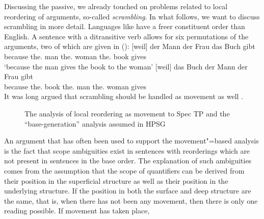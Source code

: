 \documentclass[output=paper
	        ,collection
	        ,collectionchapter
 	        ,biblatex
                ,babelshorthands
                ,newtxmath
                ,draftmode
                ,colorlinks, citecolor=brown
]{langscibook}
\begin{document}
Discussing the passive, we already touched on problems related to local reordering of arguments,
so-called \emph{scrambling}. In what follows, we want
to discuss scrambling in more detail. Languages like  have a freer constituent
order than English. A sentence with a ditransitive verb allows for six permutations of
the arguments, two of which are given in ():
\eal
\label{ex-gb-umstellung}
\ex 
\gll {}[weil] der Mann der Frau das Buch gibt\\
     \spacebr{}because the.\nom{} man the.\dat{} woman the.\acc{} book gives\\
\glt `because the man gives the book to the woman'
\ex\label{ex-das-buch-der-mann-der-frau-gibt} 
\gll {}[weil] das Buch der Mann der Frau gibt\\
     \spacebr{}because the.\acc{} book the.\nom{} man the.\dat{} woman gives\\
\zl
It was long argued that scrambling should be handled as movement as well \citep{Frey93a}.
\begin{figure}
\hfill
{}
\caption{The analysis of local reordering as movement to Spec TP and the ``base-generation'' analysis
  assumed in HPSG}\label{fig-das-buch-der-mann-der-frau-gibt-movement}
\end{figure}%
%
An argument that has often been used to support the movement"=based analysis is the fact that scope ambiguities
exist in sentences with reorderings which are not present in sentences in the base order. The
explanation of such ambiguities comes from the assumption that the scope of quantifiers can be
derived from their position in the superficial structure as well as their position in the underlying
structure. If the position in both the surface and deep structure are the same, that is, when there
has not been any movement, then there is only one reading possible. If movement has taken place,
\end{document}
